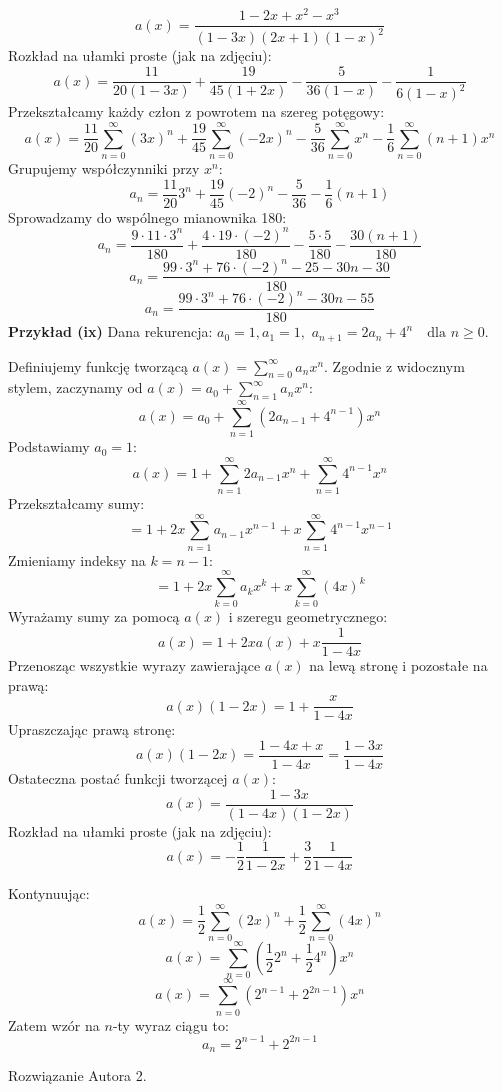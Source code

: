 \documentclass{mwart}
\begin{document}
\begin{mdframed}
    $$ a(x) = \frac{1 - 2x + x^2 - x^3}{(1-3x)(2x+1)(1-x)^2} $$
    Rozkład na ułamki proste (jak na zdjęciu):
    $$ a(x) = \frac{11}{20(1-3x)} + \frac{19}{45(1+2x)} - \frac{5}{36(1-x)} - \frac{1}{6(1-x)^2} $$
    Przekształcamy każdy człon z powrotem na szereg potęgowy:
    $$ a(x) = \frac{11}{20} \sum_{n=0}^{\infty} (3x)^n + \frac{19}{45} \sum_{n=0}^{\infty} (-2x)^n - \frac{5}{36} \sum_{n=0}^{\infty} x^n - \frac{1}{6} \sum_{n=0}^{\infty} (n+1)x^n $$
    Grupujemy współczynniki przy $x^n$:
    $$ a_n = \frac{11}{20} 3^n + \frac{19}{45} (-2)^n - \frac{5}{36} - \frac{1}{6}(n+1) $$
    Sprowadzamy do wspólnego mianownika 180:
    $$ a_n = \frac{9 \cdot 11 \cdot 3^n}{180} + \frac{4 \cdot 19 \cdot (-2)^n}{180} - \frac{5 \cdot 5}{180} - \frac{30(n+1)}{180} $$
    $$ a_n = \frac{99 \cdot 3^n + 76 \cdot (-2)^n - 25 - 30n - 30}{180} $$
    $$ a_n = \frac{99 \cdot 3^n + 76 \cdot (-2)^n - 30n - 55}{180} $$
    \textbf{Przykład (ix)}\newline
    Dana rekurencja:
    $a_0 = 1, a_1 = 1,$
    $a_{n+1} = 2a_n + 4^n \quad \text{dla } n \ge 0.$

    Definiujemy funkcję tworzącą $a(x) = \sum_{n=0}^{\infty} a_n x^n$.
    Zgodnie z widocznym stylem, zaczynamy od $a(x) = a_0 + \sum_{n=1}^{\infty} a_n x^n$:
    $$ a(x) = a_0 + \sum_{n=1}^{\infty} (2a_{n-1} + 4^{n-1}) x^n $$
    Podstawiamy $a_0 = 1$:
    $$ a(x) = 1 + \sum_{n=1}^{\infty} 2a_{n-1} x^n + \sum_{n=1}^{\infty} 4^{n-1} x^n $$
    Przekształcamy sumy:
    $$ = 1 + 2x \sum_{n=1}^{\infty} a_{n-1} x^{n-1} + x \sum_{n=1}^{\infty} 4^{n-1} x^{n-1} $$
    Zmieniamy indeksy na $k=n-1$:
    $$ = 1 + 2x \sum_{k=0}^{\infty} a_k x^k + x \sum_{k=0}^{\infty} (4x)^k $$
    Wyrażamy sumy za pomocą $a(x)$ i szeregu geometrycznego:
    $$ a(x) = 1 + 2x a(x) + x \frac{1}{1-4x} $$
    Przenosząc wszystkie wyrazy zawierające $a(x)$ na lewą stronę i pozostałe na prawą:
    $$ a(x) (1 - 2x) = 1 + \frac{x}{1-4x} $$
    Upraszczając prawą stronę:
    $$ a(x) (1 - 2x) = \frac{1-4x+x}{1-4x} = \frac{1-3x}{1-4x} $$
    Ostateczna postać funkcji tworzącej $a(x)$:
    $$ a(x) = \frac{1-3x}{(1-4x)(1-2x)} $$
    Rozkład na ułamki proste (jak na zdjęciu):
    $$ a(x) = -\frac{1}{2} \frac{1}{1-2x} + \frac{3}{2} \frac{1}{1-4x} $$

    Kontynuując:
    $$ a(x) = \frac{1}{2} \sum_{n=0}^{\infty} (2x)^n + \frac{1}{2} \sum_{n=0}^{\infty} (4x)^n $$
    $$ a(x) = \sum_{n=0}^{\infty} \left( \frac{1}{2} 2^n + \frac{1}{2} 4^n \right) x^n $$
    $$ a(x) = \sum_{n=0}^{\infty} (2^{n-1} + 2^{2n-1}) x^n $$
    Zatem wzór na $n$-ty wyraz ciągu to:
    $$ a_n = 2^{n-1} + 2^{2n-1} $$
\end{mdframed}
\begin{mdframed}
    Rozwiązanie Autora 2.
\end{mdframed}
\end{document}
